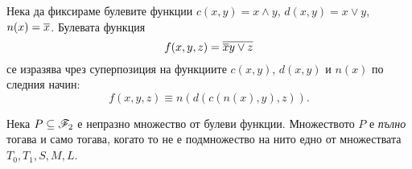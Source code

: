 \begin{example}
  Нека да фиксираме булевите функции $c(x,y) = x\wedge y$, $d(x,y) = x\vee y$, $n(x) = \overline{x}$.
  Булевата функция \[f(x,y,z) = \overline{\overline{x}y \vee z}\] се изразява чрез суперпозиция на функциите $c(x,y)$, $d(x,y)$ и $n(x)$
  по следния начин:
  \[f(x,y,z) \equiv n(d(c(n(x),y),z)).\]
\end{example}


\begin{framed}
  \begin{thm}
    Нека $P\subseteq \mathscr{F}_2$ е непразно множество от булеви функции. Множеството $P$ е {\em пълно} тогава и само тогава, когато то не е подмножество на 
    нито едно от множествата $T_0,T_1,S,M,L$.
  \end{thm}
\end{framed}

  
  

